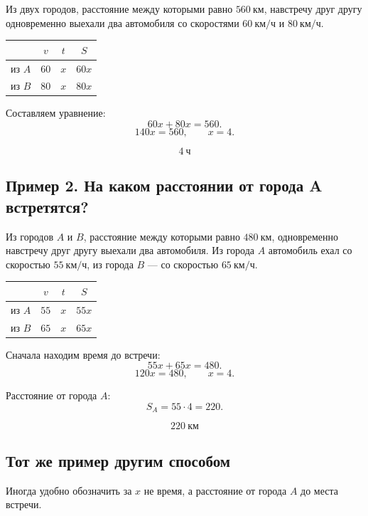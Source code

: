 \documentclass[a4paper,12pt]{article}
\newcommand{\kmh}{\text{км/ч}}
\newcommand{\km}{\text{км}}
\newcommand{\ch}{\text{ч}}
\begin{document}
Из двух городов, расстояние между которыми равно $560\ \km$, навстречу друг другу одновременно выехали два автомобиля со скоростями $60\ \kmh$ и $80\ \kmh$.

\begin{center}
\renewcommand{\arraystretch}{1.35}
\begin{tabularx}{0.7\linewidth}{X c c c}
\toprule
 & $v$ & $t$ & $S$ \\
\midrule
из $A$ & $60$ & $x$ & $60x$ \\
из $B$ & $80$ & $x$ & $80x$ \\
\bottomrule
\end{tabularx}
\end{center}

Составляем уравнение:
\[
60x+80x=560.
\]
\[
140x=560, \qquad x=4.
\]

\[
\boxed{4\ \ch}
\]

\subsection{Пример 2. На каком расстоянии от города A встретятся?}

Из городов $A$ и $B$, расстояние между которыми равно $480\ \km$, одновременно навстречу друг другу выехали два автомобиля. Из города $A$ автомобиль ехал со скоростью $55\ \kmh$, из города $B$ --- со скоростью $65\ \kmh$.

\begin{center}
\renewcommand{\arraystretch}{1.35}
\begin{tabularx}{0.7\linewidth}{X c c c}
\toprule
 & $v$ & $t$ & $S$ \\
\midrule
из $A$ & $55$ & $x$ & $55x$ \\
из $B$ & $65$ & $x$ & $65x$ \\
\bottomrule
\end{tabularx}
\end{center}

Сначала находим время до встречи:
\[
55x+65x=480.
\]
\[
120x=480, \qquad x=4.
\]

Расстояние от города $A$:
\[
S_A=55\cdot 4=220.
\]

\[
\boxed{220\ \km}
\]

\subsection{Тот же пример другим способом}

Иногда удобно обозначить за $x$ не время, а расстояние от города $A$ до места встречи.
\end{document}
